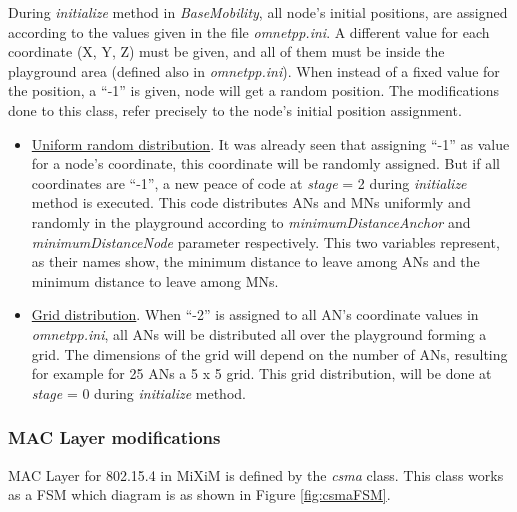During \textit{initialize} method in \textit{BaseMobility}, all node's initial positions, are assigned according to the values given in the file
\textit{omnetpp.ini}. A different value for each coordinate (X, Y, Z) must be given, and all of them must be inside the playground area (defined also
in \textit{omnetpp.ini}). When instead of a fixed value for the position, a ``-1'' is given, node will get a random position. The modifications done to
this class, refer precisely to the node's initial position assignment.

\begin{itemize}
 \item \underline{Uniform random distribution}. It was already seen that assigning ``-1'' as value for a node's coordinate, this coordinate will be 
randomly assigned. But if all coordinates are ``-1'', a new peace of code at \textit{stage} = 2 during \textit{initialize} method is executed. This 
code distributes \acp{AN} and \acp{MN} uniformly and randomly in the playground according to \textit{minimumDistanceAnchor} and 
\textit{minimumDistanceNode} parameter respectively. This two variables represent, as their names show, the minimum distance to leave among \acp{AN} 
and the minimum distance to leave among \acp{MN}.
 \item \underline{Grid distribution}. When ``-2'' is assigned to all \ac{AN}'s coordinate values in \textit{omnetpp.ini}, all \acp{AN} will be 
distributed all over the playground forming a grid. The dimensions of the grid will depend on the number of \acp{AN}, resulting for example for 25 
\acp{AN} a 5 x 5 grid. This grid distribution, will be done at \textit{stage} = 0 during \textit{initialize} method.
\end{itemize}

\subsubsection{\ac{MAC} Layer modifications}
\label{sec:macmodifications}

\ac{MAC} Layer for 802.15.4 in \ac{MiXiM} is defined by the \textit{csma} class. This class works as a \ac{FSM} which diagram is as shown in Figure 
\ref{fig:csmaFSM}.

